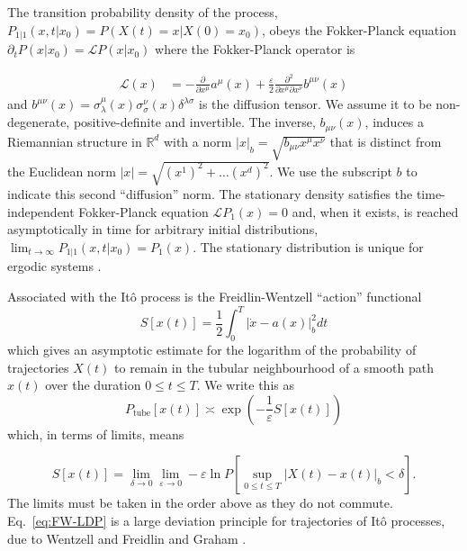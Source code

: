 The transition probability density
of the process, $P_{1|1}(x,t|x_{0})=P(X(t)=x|X(0)=x_{0})$, obeys
the Fokker-Planck equation $\partial_{t}P(x|x_{0})=\mathcal{L}P(x|x_{0})$
where the Fokker-Planck operator is

\emph{
\begin{equation}
\begin{aligned}\mathcal{L}(x) & =-\frac{\partial}{\partial x^{\mu}}a^{\mu}(x)+\frac{\varepsilon}{2}\frac{\partial^{2}}{\partial x^{\mu}\partial x^{\nu}}b^{\mu\nu}(x)\end{aligned}
\label{eq:fokker-planck}
\end{equation}
}and \textbf{$b^{\mu\nu}(x)=\sigma_{\lambda}^{\mu}(x)\sigma_{\sigma}^{\nu}(x)\delta^{\lambda\sigma}$}
is the diffusion tensor. We assume it to be non-degenerate, positive-definite
and invertible. The inverse, $b_{\mu\nu}(x)$, induces a Riemannian
structure in $\mathbb{R}^{d}$ with a norm $|x|_{b}=\sqrt{b_{\mu\nu}x^{\mu}x^{\nu}}$
that is distinct from the Euclidean norm $|x|=\sqrt{(x^{1})^{2}+\ldots(x^{d})^{2}}.$
We use the subscript $b$ to indicate this second ``diffusion''
norm. The stationary density satisfies the time-independent Fokker-Planck
equation $\mathcal{L}P_{1}(x)=0$ and, when it exists, is reached
asymptotically in time for arbitrary initial distributions, $\lim_{t\rightarrow\infty}P_{1|1}(x,t|x_{0})=P_{1}(x)$.
The stationary distribution is unique for ergodic
systems \citep{pavliotisStochasticProcessesApplications2014a}. 

Associated with the Itô process is the Freidlin-Wentzell ``action''
functional \citep{wentzellSmallRandomPerturbations1970, graham1973statistical, graham1987macroscopic}
\begin{equation}
S[x(t)]=\frac{1}{2}\int_{0}^{T}|\dot{x}-a(x)|_{b}^{2}dt\label{eq:Freidlin-Wentzell action}
\end{equation}
which gives an asymptotic estimate for the logarithm of the probability
of trajectories $X(t)$ to remain in the tubular neighbourhood of
a smooth path $x(t)$ over the duration $0\le t\leq T$. We write
this as
\begin{equation}
P_{\text{tube}}[x(t)]\asymp\exp\left(-\frac{1}{\varepsilon}S[x(t)]\right)\label{eq:FW-LDP}
\end{equation}
which, in terms of limits, means

\[
S[x(t)]=\lim_{\delta\to0}\lim_{\varepsilon\to0}-\varepsilon\ln P\left[\sup_{0\leq t\leq T}|X(t)-x(t)|_{b}<\delta\right].
\]
The limits must be taken in the order above as they do not commute.
Eq.~\ref{eq:FW-LDP} is a large deviation principle for trajectories
of Itô processes, due to Wentzell and Freidlin and Graham \citep{touchetteLargeDeviationApproach2009}.

